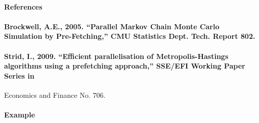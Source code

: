 \paragraph{References}\label{references}

\paragraph{Brockwell, A.E., 2005. ``Parallel Markov Chain Monte Carlo
Simulation by Pre-Fetching,'' CMU Statistics Dept. Tech. Report
802.}\label{brockwell-a.e.-2005.-parallel-markov-chain-monte-carlo-simulation-by-pre-fetching-cmu-statistics-dept.-tech.-report-802.}

\paragraph{Strid, I., 2009. ``Efficient parallelisation of
Metropolis-Hastings algorithms using a prefetching approach,'' SSE/EFI
Working Paper Series
in}\label{strid-i.-2009.-efficient-parallelisation-of-metropolis-hastings-algorithms-using-a-prefetching-approach-sseefi-working-paper-series-in}

Economics and Finance No. 706.

\paragraph{Example}\label{example}


